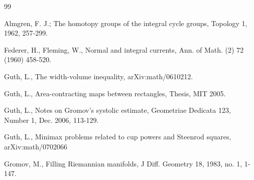 \documentclass{amsart}
\newtheorem*{Theorem 1}{Theorem 1}
\newtheorem*{Theorem 2}{Theorem 2}
\newtheorem*{Estimate 1}{Estimate 1}
\newtheorem*{Estimate 2}{Estimate 2}
\newtheorem*{key lemma}{Key Lemma}
\numberwithin{equation}{section}
\begin{document}
\begin{thebibliography}{99}

 Almgren, F. J.; The homotopy groups of the integral cycle groups,
Topology 1, 1962, 257-299.

 Federer, H., Fleming, W., Normal and integral
currents, Ann. of Math. (2) 72 (1960) 458-520.

 Guth, L., The width-volume inequality, 
arXiv:math/0610212.

 Guth, L., Area-contracting maps between rectangles, Thesis, MIT 2005.

 Guth, L., Notes on Gromov's systolic estimate,
Geometriae Dedicata 123, Number 1, Dec. 2006, 113-129.

 Guth, L., Minimax problems related to cup
powers and Steenrod squares, arXiv:math/0702066

 Gromov, M., Filling Riemannian manifolds,
J Diff. Geometry 18, 1983, no. 1, 1-147.

\end{thebibliography}
\end{document}
